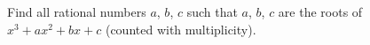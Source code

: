 Find all rational numbers $a$, $b$, $c$ such that $a$, $b$, $c$ are the roots of $x^3+ax^2+bx+c$ (counted with multiplicity).
